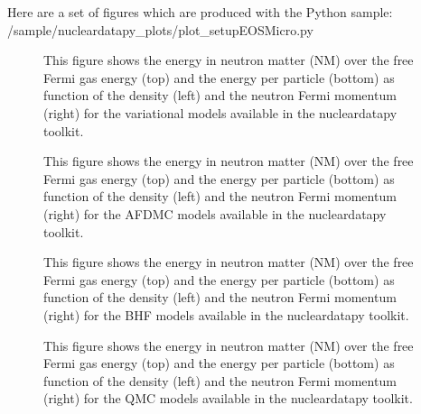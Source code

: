 \documentclass[letterpaper,10pt,english]{sphinxmanual}
\begin{document}
\sphinxAtStartPar
Here are a set of figures which are produced with the Python sample: /sample/nucleardatapy\_plots/plot\_setupEOSMicro.py

\begin{figure}[htbp]
\centering
\capstart

\noindent{}
\caption{This figure shows the energy in neutron matter (NM) over the free Fermi gas energy (top) and the energy per particle (bottom) as function of the density (left) and the neutron Fermi momentum (right) for the variational models available in the nucleardatapy toolkit.}\label{\detokenize{source/api/setup_eos_micro:id1}}\end{figure}

\begin{figure}[htbp]
\centering
\capstart

\noindent{}
\caption{This figure shows the energy in neutron matter (NM) over the free Fermi gas energy (top) and the energy per particle (bottom) as function of the density (left) and the neutron Fermi momentum (right) for the AFDMC models available in the nucleardatapy toolkit.}\label{\detokenize{source/api/setup_eos_micro:id2}}\end{figure}

\begin{figure}[htbp]
\centering
\capstart

\noindent{}
\caption{This figure shows the energy in neutron matter (NM) over the free Fermi gas energy (top) and the energy per particle (bottom) as function of the density (left) and the neutron Fermi momentum (right) for the BHF models available in the nucleardatapy toolkit.}\label{\detokenize{source/api/setup_eos_micro:id3}}\end{figure}

\begin{figure}[htbp]
\centering
\capstart

\noindent{}
\caption{This figure shows the energy in neutron matter (NM) over the free Fermi gas energy (top) and the energy per particle (bottom) as function of the density (left) and the neutron Fermi momentum (right) for the QMC models available in the nucleardatapy toolkit.}\label{\detokenize{source/api/setup_eos_micro:id4}}\end{figure}
\end{document}
